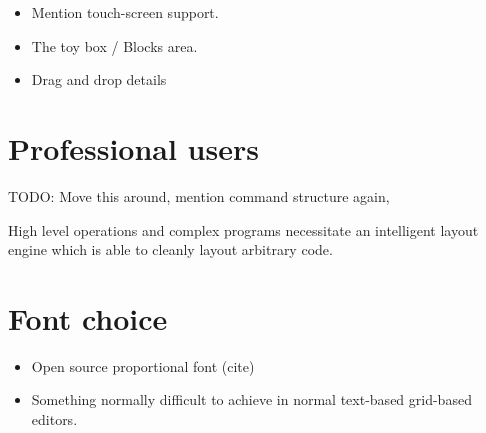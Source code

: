 \begin{itemize}
	\item Mention touch-screen support.
	\item The toy box / Blocks area.
	\item Drag and drop details
\end{itemize}

\section{Professional users}

TODO: Move this around, mention command structure again,

High level operations and complex programs necessitate an intelligent layout
engine which is able to cleanly layout arbitrary code.

\section{Font choice}

\begin{itemize}
	\item Open source proportional font (cite)
	\item Something normally difficult to achieve in normal text-based grid-based
	editors.
	
\end{itemize}